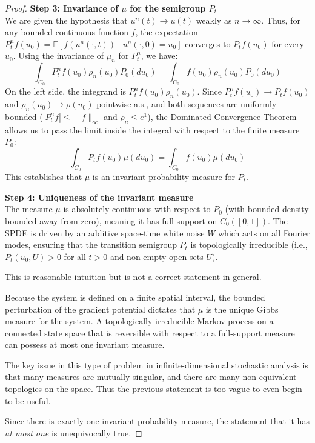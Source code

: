 \documentclass[12pt]{article}
\newcommand{\review}[1]{\begin{reviewbox}#1\end{reviewbox}}
\begin{document}
\begin{proof}
\medskip\noindent
\textbf{Step 3: Invariance of $\mu$ for the semigroup $P_t$}\\
We are given the hypothesis that $u^n(t) \to u(t)$ weakly as $n \to \infty$. Thus, for any bounded continuous function $f$, the expectation $P^n_t f(u_0) = \mathbb{E}[f(u^n(\cdot, t)) \mid u^n(\cdot, 0) = u_0]$ converges to $P_t f(u_0)$ for every $u_0$.
Using the invariance of $\mu_n$ for $P^n_t$, we have:
\[ \int_{C_0} P^n_t f(u_0) \rho_n(u_0) P_0(du_0) = \int_{C_0} f(u_0) \rho_n(u_0) P_0(du_0) \]
On the left side, the integrand is $P^n_t f(u_0) \rho_n(u_0)$. Since $P^n_t f(u_0) \to P_t f(u_0)$ and $\rho_n(u_0) \to \rho(u_0)$ pointwise a.s., and both sequences are uniformly bounded ($|P^n_t f| \le \|f\|_\infty$ and $\rho_n \le e^1$), the Dominated Convergence Theorem allows us to pass the limit inside the integral with respect to the finite measure $P_0$:
\[ \int_{C_0} P_t f(u_0) \mu(du_0) = \int_{C_0} f(u_0) \mu(du_0) \]
This establishes that $\mu$ is an invariant probability measure for $P_t$. 

\medskip\noindent
\textbf{Step 4: Uniqueness of the invariant measure}\\
The measure $\mu$ is absolutely continuous with respect to $P_0$ (with bounded density bounded away from zero), meaning it has full support on $C_0([0,1])$. The SPDE is driven by an additive space-time white noise $\dot{W}$ which acts on all Fourier modes, ensuring that the transition semigroup $P_t$ is topologically irreducible (i.e., $P_t(u_0, U) > 0$ for all $t > 0$ and non-empty open sets $U$). 
\review{This is reasonable intuition but is not a correct statement in general.}

Because the system is defined on a finite spatial interval, the bounded perturbation of the gradient potential dictates that $\mu$ is the unique Gibbs measure for the system. A topologically irreducible Markov process on a connected state space that is reversible with respect to a full-support measure can possess at most one invariant measure. 
\review{The key issue in this type of problem in infinite-dimensional stochastic analysis is that many measures are mutually singular, and there are many non-equivalent topologies on the space. Thus the previous statement is too vague to even begin to be useful.}

Since there is exactly one invariant probability measure, the statement that it has \emph{at most one} is unequivocally true.
\end{proof}
\end{document}
